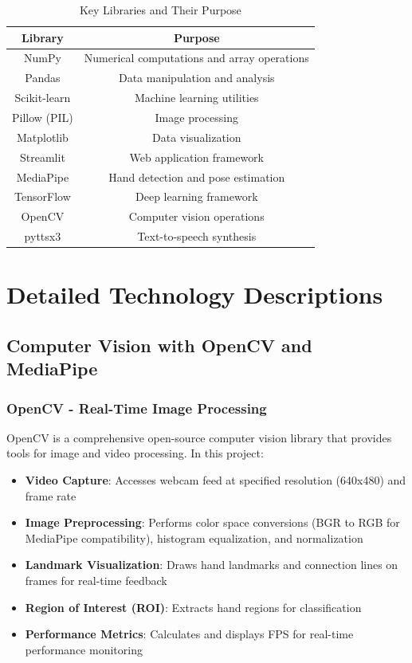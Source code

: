 \begin{table}[H]
\centering
\begin{tabular}{|c|c|}
\hline
\textbf{Library} & \textbf{Purpose} \\
\hline
NumPy & Numerical computations and array operations \\
\hline
Pandas & Data manipulation and analysis \\
\hline
Scikit-learn & Machine learning utilities \\
\hline
Pillow (PIL) & Image processing \\
\hline
Matplotlib & Data visualization \\
\hline
Streamlit & Web application framework \\
\hline
MediaPipe & Hand detection and pose estimation \\
\hline
TensorFlow & Deep learning framework \\
\hline
OpenCV & Computer vision operations \\
\hline
pyttsx3 & Text-to-speech synthesis \\
\hline
\end{tabular}
\caption{Key Libraries and Their Purpose}
\end{table}

\section{Detailed Technology Descriptions}

\subsection{Computer Vision with OpenCV and MediaPipe}

\subsubsection{OpenCV - Real-Time Image Processing}

OpenCV is a comprehensive open-source computer vision library that provides tools for image and video processing. In this project:

\begin{itemize}
    \item \textbf{Video Capture}: Accesses webcam feed at specified resolution (640x480) and frame rate
    \item \textbf{Image Preprocessing}: Performs color space conversions (BGR to RGB for MediaPipe compatibility), histogram equalization, and normalization
    \item \textbf{Landmark Visualization}: Draws hand landmarks and connection lines on frames for real-time feedback
    \item \textbf{Region of Interest (ROI)}: Extracts hand regions for classification
    \item \textbf{Performance Metrics}: Calculates and displays FPS for real-time performance monitoring
\end{itemize}


